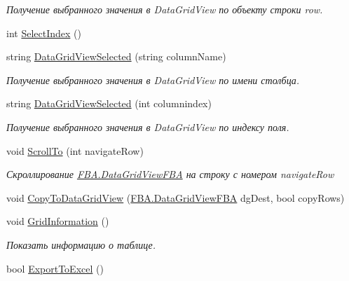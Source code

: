\begin{DoxyCompactItemize}
\begin{DoxyCompactList}\small\item\em Получение выбранного значения в Data\+Grid\+View по объекту строки row. \end{DoxyCompactList}\item 
int \mbox{\hyperlink{class_f_b_a_1_1_data_grid_view_f_b_a_a9a3bd40eeff85bb51a55393516dd9f36}{Select\+Index}} ()
\item 
string \mbox{\hyperlink{class_f_b_a_1_1_data_grid_view_f_b_a_a3a5c48eba36f68240ed3f960dda77473}{Data\+Grid\+View\+Selected}} (string column\+Name)
\begin{DoxyCompactList}\small\item\em Получение выбранного значения в Data\+Grid\+View по имени столбца. \end{DoxyCompactList}\item 
string \mbox{\hyperlink{class_f_b_a_1_1_data_grid_view_f_b_a_a3f33f55c2ebad8ed7f4e3d10e6064b72}{Data\+Grid\+View\+Selected}} (int columnindex)
\begin{DoxyCompactList}\small\item\em Получение выбранного значения в Data\+Grid\+View по индексу поля. \end{DoxyCompactList}\item 
void \mbox{\hyperlink{class_f_b_a_1_1_data_grid_view_f_b_a_ad9026c05a20b27cc91dd2849e071b446}{Scroll\+To}} (int navigate\+Row)
\begin{DoxyCompactList}\small\item\em Скроллирование \mbox{\hyperlink{class_f_b_a_1_1_data_grid_view_f_b_a}{F\+B\+A.\+Data\+Grid\+View\+F\+BA}} на строку с номером navigate\+Row \end{DoxyCompactList}\item 
void \mbox{\hyperlink{class_f_b_a_1_1_data_grid_view_f_b_a_af609918de53571c53bfff7913904093d}{Copy\+To\+Data\+Grid\+View}} (\mbox{\hyperlink{class_f_b_a_1_1_data_grid_view_f_b_a}{F\+B\+A.\+Data\+Grid\+View\+F\+BA}} dg\+Dest, bool copy\+Rows)
\item 
void \mbox{\hyperlink{class_f_b_a_1_1_data_grid_view_f_b_a_a0d5348dea70a61d7eda6e96e7273b7ef}{Grid\+Information}} ()
\begin{DoxyCompactList}\small\item\em Показать информацию о таблице. \end{DoxyCompactList}\item 
bool \mbox{\hyperlink{class_f_b_a_1_1_data_grid_view_f_b_a_a06d59fa96611473544e9f43418ccb307}{Export\+To\+Excel}} ()

\end{DoxyCompactItemize}
